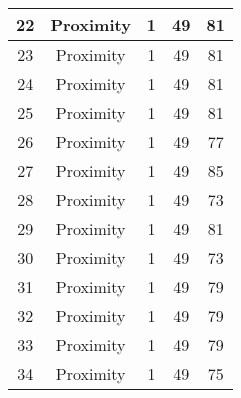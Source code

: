 \documentclass[results.tex]{subfiles}
\begin{document}
\begin{center}
\begin{tabular}{| c || c | c | c | c |}
            \hline
            22                      & Proximity                    & 1                      & 49                      & 81                   \\
            \hline
            23                      & Proximity                    & 1                      & 49                      & 81                   \\
            \hline
            24                      & Proximity                    & 1                      & 49                      & 81                   \\
            \hline
            25                      & Proximity                    & 1                      & 49                      & 81                   \\
            \hline
            26                      & Proximity                    & 1                      & 49                      & 77                   \\
            \hline
            27                      & Proximity                    & 1                      & 49                      & 85                   \\
            \hline
            28                      & Proximity                    & 1                      & 49                      & 73                   \\
            \hline
            29                      & Proximity                    & 1                      & 49                      & 81                   \\
            \hline
            30                      & Proximity                    & 1                      & 49                      & 73                   \\
            \hline
            31                      & Proximity                    & 1                      & 49                      & 79                   \\
            \hline
            32                      & Proximity                    & 1                      & 49                      & 79                   \\
            \hline
            33                      & Proximity                    & 1                      & 49                      & 79                   \\
            \hline
            34                      & Proximity                    & 1                      & 49                      & 75                   \\

\end{tabular}
\end{center}
\end{document}
